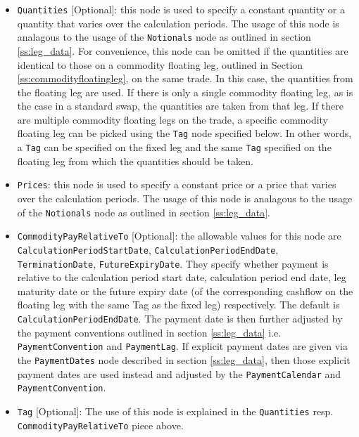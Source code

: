 \begin{itemize}

\item
\lstinline!Quantities! [Optional]: this node is used to specify a constant quantity or a quantity that varies over the calculation periods. The usage of this node is analagous to the usage of the \lstinline!Notionals! node as outlined in section \ref{ss:leg_data}. For convenience, this node can be omitted if the quantities are identical to those on a commodity floating leg, outlined in Section \ref{ss:commodityfloatingleg}, on the same trade. In this case, the quantities from the floating leg are used. If there is only a single commodity floating leg, as is the case in a standard swap, the quantities are taken from that leg. If there are multiple commodity floating legs on the trade, a specific commodity floating leg can be picked using the \lstinline!Tag! node specified below. In other words, a \lstinline!Tag! can be specified on the fixed leg and the same \lstinline!Tag! specified on the floating leg from which the quantities should be taken.

\item
\lstinline!Prices!: this node is used to specify a constant price or a price that varies over the calculation periods. The usage of this node is analagous to the usage of the \lstinline!Notionals! node as outlined in section \ref{ss:leg_data}.

\item
\lstinline!CommodityPayRelativeTo! [Optional]: the allowable values for this node are \\
\lstinline!CalculationPeriodStartDate!, \lstinline!CalculationPeriodEndDate!, \lstinline!TerminationDate!, \lstinline!FutureExpiryDate!. They specify whether payment is relative to the calculation period start date, calculation period end date, leg maturity date or the future expiry date (of the corresponding cashflow on the floating leg with the same Tag as the fixed leg) respectively. The default is \lstinline!CalculationPeriodEndDate!. The payment date is then further adjusted by the payment conventions outlined in section \ref{ss:leg_data} i.e. \lstinline!PaymentConvention! and \lstinline!PaymentLag!. If explicit payment dates are given via the \lstinline!PaymentDates! node described in section \ref{ss:leg_data}, then those explicit payment dates are used instead and adjusted by the \lstinline!PaymentCalendar! and \lstinline!PaymentConvention!.

\item
\lstinline!Tag! [Optional]: The use of this node is explained in the \lstinline!Quantities! resp. \lstinline!CommodityPayRelativeTo! piece above.

\end{itemize}

